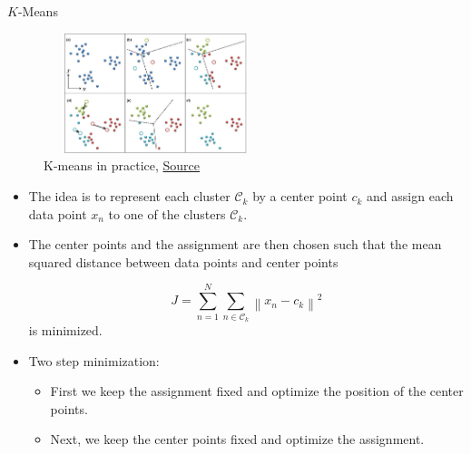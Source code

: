 \documentclass[compress,oilve]{beamer}
\begin{document}

\begin{frame}{$K$-Means}
		
	\begin{figure}[H]
		\includegraphics[width=6.5cm, height=3.5cm]{Figs/4.png}
		\caption{K-means in practice, \href{	https://tinyurl.com/2q6ec2c6}{Source}}
	\end{figure}
	
	\begin{itemize}
		
		\item The idea is to represent each cluster $\mathcal{C}_k$ by a center point $c_k$ and assign each data point $x_n$ to one of the clusters $\mathcal{C}_k$.
		
		\medskip
		\item The center points and the assignment are then chosen such that the mean squared distance between data points and center points
		
		\begin{equation*}
			J=\sum_{n=1}^N \sum_{n\in\mathcal{C}_k} \left\|x_n-c_k\right\|^2
		\end{equation*}
	is minimized.
	
	\item Two step minimization:
	\begin{itemize}
		\item First we keep the assignment fixed and optimize the position of the center points.
		\item Next, we keep the center points fixed and optimize the
		assignment.
		
	\end{itemize}
	\end{itemize}
\end{frame}
\end{document}
